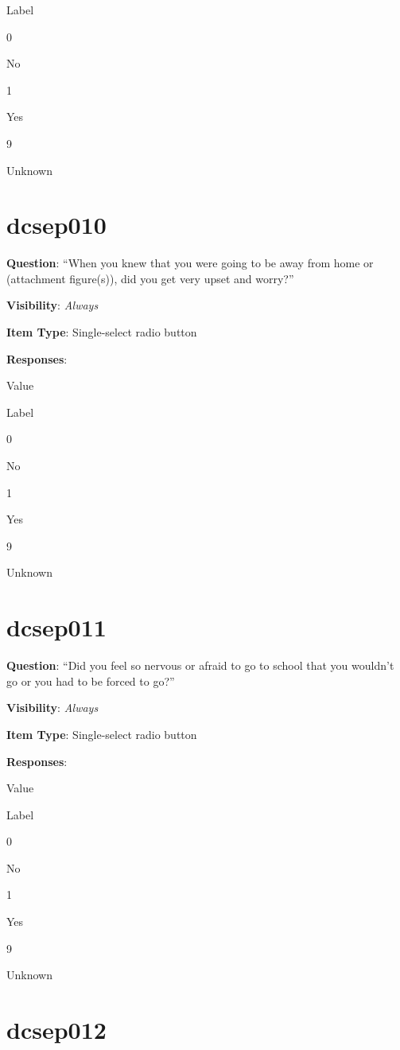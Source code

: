 \documentclass[]{book}
\begin{document}
Label

0

No

1

Yes

9

Unknown

\hypertarget{dcsep010}{%
\section{dcsep010}\label{dcsep010}}

\textbf{Question}: ``When you knew that you were going to be away from home or (attachment figure(s)), did you get very upset and worry?''

\textbf{Visibility}: \emph{Always}

\textbf{Item Type}: Single-select radio button

\textbf{Responses}:

Value

Label

0

No

1

Yes

9

Unknown

\hypertarget{dcsep011}{%
\section{dcsep011}\label{dcsep011}}

\textbf{Question}: ``Did you feel so nervous or afraid to go to school that you wouldn't go or you had to be forced to go?''

\textbf{Visibility}: \emph{Always}

\textbf{Item Type}: Single-select radio button

\textbf{Responses}:

Value

Label

0

No

1

Yes

9

Unknown

\hypertarget{dcsep012}{%
\section{dcsep012}\label{dcsep012}}
\end{document}
